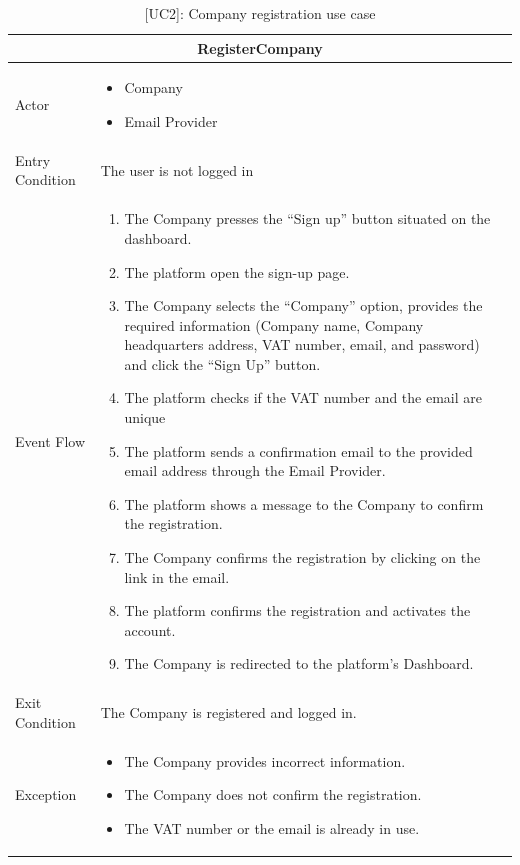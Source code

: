 \clearpage
\begin{table}[H]
    \centering
    \begin{tabular}{|p{3cm}|p{12cm}|}
    \hline
    \multicolumn{2}{|c|}{\textbf{RegisterCompany}} \\ \hline
    Actor & 
    \begin{itemize}
        \item Company
        \item Email Provider
    \end{itemize} \\ \hline
    Entry Condition & The user is not logged in \\ \hline
    Event Flow &
    \begin{enumerate}         
        \item The Company presses the “Sign up” button situated on the dashboard.
        \item The platform open the sign-up page.
        \item The Company selects the “Company” option, provides the required information (Company name, Company headquarters address, VAT number, email, and password) and click the “Sign Up” button.
        \item The platform checks if the VAT number and the email are unique
        \item The platform sends a confirmation email to the provided email address through the Email Provider.
        \item The platform shows a message to the Company to confirm the registration.
        \item The Company confirms the registration by clicking on the link in the email.
        \item The platform confirms the registration and activates the account.
        \item The Company is redirected to the platform's Dashboard.
    \end{enumerate} \\ \hline
    Exit Condition & The Company is registered and logged in. \\ \hline
    Exception & 
    \begin{itemize}
        \item The Company provides incorrect information.
        \item The Company does not confirm the registration.
        \item The VAT number or the email is already in use.
    \end{itemize} \\ \hline
    \end{tabular}
    \caption{[UC2]: Company registration use case}
    \label{tab:UC2}
\end{table}

